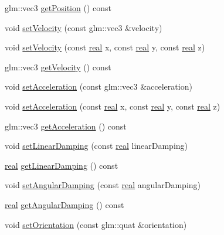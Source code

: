 \begin{DoxyCompactItemize}
glm\+::vec3 \hyperlink{classrum_1_1_rigid_body_a9221f1b74f8a258a9ad050ddaea64412}{get\+Position} () const
\item 
void \hyperlink{classrum_1_1_rigid_body_a807a0309fef97be32db6f1e981e2f029}{set\+Velocity} (const glm\+::vec3 \&velocity)
\item 
void \hyperlink{classrum_1_1_rigid_body_a9c0d7b85a4fa9fcd4fa4a7ab3e309234}{set\+Velocity} (const \hyperlink{namespacerum_a7e8cca23573d5eaead0f138cbaa4862c}{real} x, const \hyperlink{namespacerum_a7e8cca23573d5eaead0f138cbaa4862c}{real} y, const \hyperlink{namespacerum_a7e8cca23573d5eaead0f138cbaa4862c}{real} z)
\item 
glm\+::vec3 \hyperlink{classrum_1_1_rigid_body_a4e321b456c54e8090e1c897d513829f9}{get\+Velocity} () const
\item 
void \hyperlink{classrum_1_1_rigid_body_a217a8370a7196e29e2e02fa57cde9bb4}{set\+Acceleration} (const glm\+::vec3 \&acceleration)
\item 
void \hyperlink{classrum_1_1_rigid_body_a663501367c795254a324349d55b3f6f6}{set\+Acceleration} (const \hyperlink{namespacerum_a7e8cca23573d5eaead0f138cbaa4862c}{real} x, const \hyperlink{namespacerum_a7e8cca23573d5eaead0f138cbaa4862c}{real} y, const \hyperlink{namespacerum_a7e8cca23573d5eaead0f138cbaa4862c}{real} z)
\item 
glm\+::vec3 \hyperlink{classrum_1_1_rigid_body_a8b303ca817b107348692e5b442ae7a56}{get\+Acceleration} () const
\item 
void \hyperlink{classrum_1_1_rigid_body_ac7afc4f115c4a387aa9e6929c9d7a40c}{set\+Linear\+Damping} (const \hyperlink{namespacerum_a7e8cca23573d5eaead0f138cbaa4862c}{real} linear\+Damping)
\item 
\hyperlink{namespacerum_a7e8cca23573d5eaead0f138cbaa4862c}{real} \hyperlink{classrum_1_1_rigid_body_a637e50a502427fdd128873a015e84997}{get\+Linear\+Damping} () const
\item 
void \hyperlink{classrum_1_1_rigid_body_a205cac5b6c9a0d7ce8371e94af3b95ee}{set\+Angular\+Damping} (const \hyperlink{namespacerum_a7e8cca23573d5eaead0f138cbaa4862c}{real} angular\+Damping)
\item 
\hyperlink{namespacerum_a7e8cca23573d5eaead0f138cbaa4862c}{real} \hyperlink{classrum_1_1_rigid_body_a13f45609fd48d44695190a4bd81f2ad7}{get\+Angular\+Damping} () const
\item 
void \hyperlink{classrum_1_1_rigid_body_a2f4565f3884f4870403a2f6000860a81}{set\+Orientation} (const glm\+::quat \&orientation)
\item 

\end{DoxyCompactItemize}
